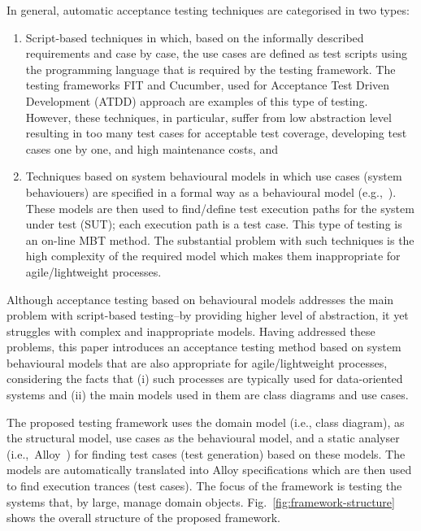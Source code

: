 In general, automatic acceptance testing techniques are categorised in two types:
\begin{enumerate}
	\item Script-based techniques in which, based on the informally described requirements and case by case, the use cases are defined as test scripts using the programming language that is required by the testing framework. The testing frameworks FIT and Cucumber, used for Acceptance Test Driven Development (ATDD) approach are examples of this type of testing. However, these techniques, in particular, suffer from low abstraction level resulting in too many test cases for acceptable test coverage, developing test cases one by one, and high maintenance costs, and 
	
	\item Techniques based on system behavioural models in which use cases (system behaviouers) are specified in a formal way as a behavioural model (e.g.,~\cite{Nebut2006,Sarma2007,Kaplan2008}). These models are then used to find/define test execution paths for the system under test (SUT); each execution path is a test case. This type of testing is an on-line MBT method. The substantial problem with such techniques is the high complexity of the required model which makes them inappropriate for agile/lightweight processes.
\end{enumerate} 

Although acceptance testing based on behavioural models addresses the main problem with script-based testing--by providing higher level of abstraction, it yet struggles with complex and inappropriate models. Having addressed these problems, this paper introduces an acceptance testing method based on system behavioural models that are also appropriate for agile/lightweight processes, considering the facts that (i) such processes are typically used for data-oriented systems and (ii) the main models used in them are class diagrams and use cases. 

The proposed testing framework uses the domain model (i.e., class diagram), as the structural model, use cases as the behavioural model, and a static analyser (i.e.,\ Alloy~\cite{Jackson2002}) for finding test cases (test generation) based on these models. The models are automatically translated into Alloy specifications which are then used to find execution trances (test cases).
The focus of the framework is testing the systems that, by large, manage domain objects. Fig.~\ref{fig:framework-structure} shows the overall structure of the proposed framework.

